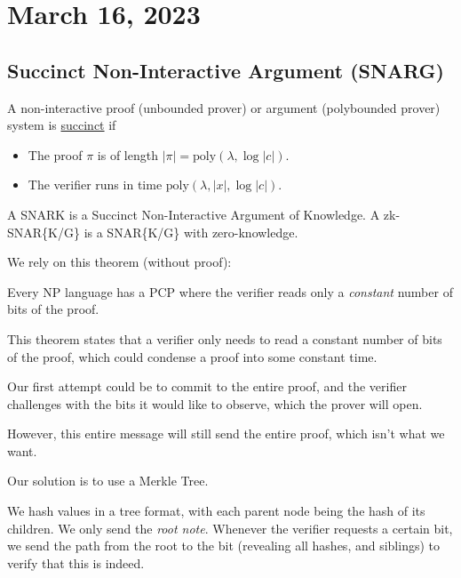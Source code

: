 \section{March 16, 2023}
\label{20230316}
\subsection{Succinct Non-Interactive Argument (SNARG)}
\begin{definition}
    A non-interactive proof (unbounded prover) or argument (polybounded prover) system is \ul{succinct} if
    \begin{itemize}
        \item The proof $\pi$ is of length $|\pi| = \mathrm{poly}(\lambda, \log|c|)$.
        \item The verifier runs in time $\mathrm{poly}(\lambda, |x|, \log |c|)$.
    \end{itemize}
\end{definition}

A SNARK is a Succinct Non-Interactive Argument of Knowledge. A zk-SNAR\{K/G\} is a SNAR\{K/G\} with zero-knowledge.

We rely on this theorem (without proof):

\begin{theorem}
    Every NP language has a PCP where the verifier reads only a \emph{constant} number of bits of the proof.
\end{theorem}

This theorem states that a verifier only needs to read a constant number of bits of the proof, which could condense a proof into some constant time.

Our first attempt could be to commit to the entire proof, and the verifier challenges with the bits it would like to observe, which the prover will open.


However, this entire message will still send the entire proof, which isn't what we want.

Our solution is to use a Merkle Tree.

We hash values in a tree format, with each parent node being the hash of its children. We only send the \emph{root note}. Whenever the verifier requests a certain bit, we send the path from the root to the bit (revealing all hashes, and siblings) to verify that this is indeed.

